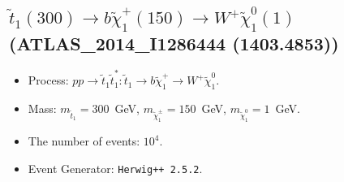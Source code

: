 \documentclass[12pt]{article}
\begin{document}
    
\subsection*{$\tilde t_1(300) \to b \tilde \chi_1^+(150) \to W^+ \tilde \chi_1^0(1)$ (ATLAS\_2014\_I1286444 (1403.4853))} 


        \begin{itemize}
        \item  Process: $pp \to \tilde t_1 \tilde t_1^*: \tilde t_1 \to b \tilde \chi_1^+ \to W^+ \tilde \chi_1^0$.
        \item  Mass: $m_{\tilde t_1} = 300$~GeV, $m_{\tilde \chi_1^\pm} = 150$~GeV, $m_{\tilde \chi_1^0} = 1$~GeV.
        \item  The number of events: $10^4$.
        \item  Event Generator: {\tt Herwig++ 2.5.2}.    
        \end{itemize}    
    
\end{document}
